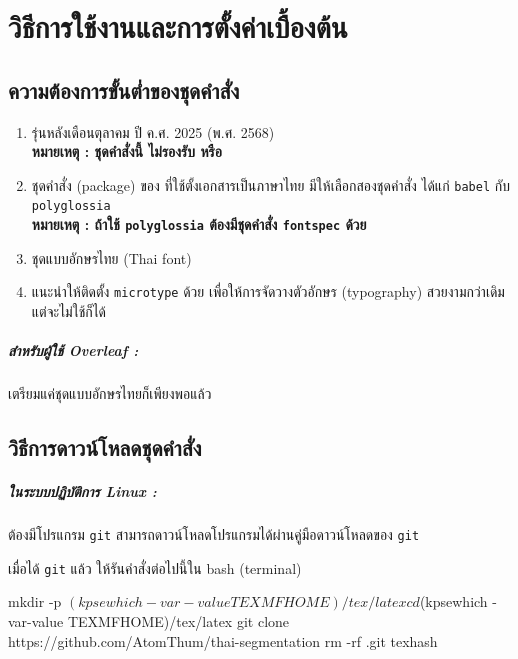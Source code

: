 \chapter{วิธีการใช้งานและการตั้งค่าเบื้องต้น}
\label{sec:introduction}

\section{ความต้องการขั้นต่ำของชุดคำสั่ง}

\begin{enumerate}
  \item \lualatexlogo รุ่นหลังเดือนตุลาคม ปี ค.ศ. 2025 (พ.ศ. 2568) \\
        \textbf{หมายเหตุ : ชุดคำสั่งนี้ ไม่รองรับ \pdftexlogo หรือ \xelatexlogo}
  \item ชุดคำสั่ง (package) ของ \latexlogo ที่ใช้ตั้งเอกสารเป็นภาษาไทย
        มีให้เลือกสองชุดคำสั่ง ได้แก่ \texttt{babel} กับ \texttt{polyglossia} \\
        \textbf{หมายเหตุ : ถ้าใช้ \texttt{polyglossia} ต้องมีชุดคำสั่ง
        \texttt{fontspec} ด้วย}
  \item ชุดแบบอักษรไทย (Thai font)
  \item แนะนำให้ติดตั้ง \texttt{microtype} ด้วย เพื่อให้การจัดวางตัวอักษร
        (typography) สวยงามกว่าเดิม แต่จะไม่ใช้ก็ได้
\end{enumerate}

\paragraph{สำหรับผู้ใช้ Overleaf :}

เตรียมแค่ชุดแบบอักษรไทยก็เพียงพอแล้ว

\section{วิธีการดาวน์โหลดชุดคำสั่ง}

\paragraph{ในระบบปฏิบัติการ Linux :}

ต้องมีโปรแกรม \texttt{git} สามารถดาวน์โหลดโปรแกรมได้ผ่านคู่มือดาวน์โหลดของ
\texttt{git} \parencite{git-installation}

เมื่อได้ \texttt{git} แล้ว ให้รันคำสั่งต่อไปนี้ใน bash (terminal)

\begin{bashsource}{}
mkdir -p $(kpsewhich -var-value TEXMFHOME)/tex/latex
cd $(kpsewhich -var-value TEXMFHOME)/tex/latex
git clone https://github.com/AtomThum/thai-segmentation
rm -rf .git
texhash
\end{bashsource}

